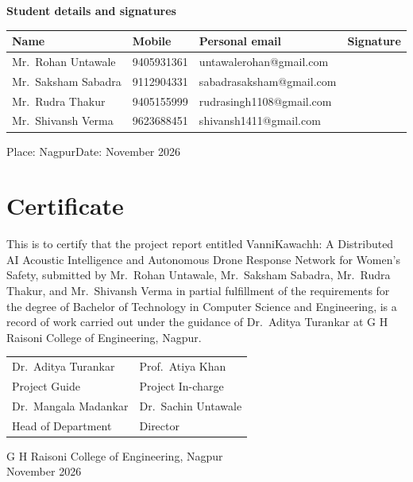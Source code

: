 \documentclass[12pt,a4paper]{report}
\begin{document}
\vspace{.6cm}
\noindent\textbf{Student details and signatures}
\begin{center}\small
\begin{tabular}{|p{}|p{}|p{}|p{}|}
\hline
\textbf{Name}&\textbf{Mobile}&\textbf{Personal email}&\textbf{Signature}\\\hline
Mr.~Rohan Untawale&9405931361&untawalerohan@gmail.com&\\\hline
Mr.~Saksham Sabadra&9112904331&sabadrasaksham@gmail.com&\\\hline
Mr.~Rudra Thakur&9405155999&rudrasingh1108@gmail.com&\\\hline
Mr.~Shivansh Verma&9623688451&shivansh1411@gmail.com&\\\hline
\end{tabular}
\end{center}
\vspace{.6cm}
\noindent Place: Nagpur\hfill Date: November 2026

\chapter*{Certificate}
This is to certify that the project report entitled VanniKawachh:
A Distributed AI Acoustic Intelligence and Autonomous Drone Response
Network for Women's Safety, submitted by Mr.~Rohan Untawale,
Mr.~Saksham Sabadra, Mr.~Rudra Thakur, and Mr.~Shivansh Verma in
partial fulfillment of the requirements for the degree of Bachelor of
Technology in Computer Science and Engineering, is a record of work
carried out under the guidance of Dr.~Aditya Turankar at G H Raisoni
College of Engineering, Nagpur.
\vspace{1.5cm}
\begin{center}
\begin{tabular}{p{}p{}}
Dr.~Aditya Turankar & Prof.~Atiya Khan\\
Project Guide & Project In-charge\\[1.2cm]
Dr.~Mangala Madankar & Dr.~Sachin Untawale\\
Head of Department & Director
\end{tabular}
\end{center}
\vfill
\begin{center}G H Raisoni College of Engineering, Nagpur\\
November 2026\end{center}
\end{document}
